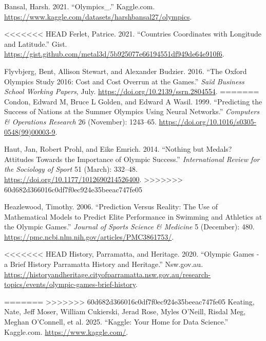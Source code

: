 \documentclass[
]{article}
\newlength{\cslhangindent}
\newenvironment{CSLReferences}[2] %
 {\begin{list}{}{%
  \setlength{\itemindent}{0pt}
  \setlength{\leftmargin}{0pt}
  \setlength{\parsep}{0pt}
  \ifodd #1
   \setlength{\leftmargin}{\cslhangindent}
   \setlength{\itemindent}{-1\cslhangindent}
  \fi
  \setlength{\itemsep}{#2\baselineskip}}}
 {\end{list}}
\begin{document}
\label{refs}
\begin{CSLReferences}{1}{0}
Bansal, Harsh. 2021. {``Olympics\_.''} Kaggle.com. \url{https://www.kaggle.com/datasets/harshbansal27/olympics}.

<<<<<<< HEAD
Ferlet, Patrice. 2021. {``Countries Coordinates with Longitude and Latitude.''} Gist. \url{https://gist.github.com/metal3d/5b925077e66194551df949de64e910f6}.

Flyvbjerg, Bent, Allison Stewart, and Alexander Budzier. 2016. {``The Oxford Olympics Study 2016: Cost and Cost Overrun at the Games.''} \emph{Saïd Business School Working Papers}, July. \url{https://doi.org/10.2139/ssrn.2804554}.
=======
Condon, Edward M, Bruce L Golden, and Edward A Wasil. 1999. {``Predicting the Success of Nations at the Summer Olympics Using Neural Networks.''} \emph{Computers \& Operations Research} 26 (November): 1243--65. \url{https://doi.org/10.1016/s0305-0548(99)00003-9}.

Haut, Jan, Robert Prohl, and Eike Emrich. 2014. {``Nothing but Medals? Attitudes Towards the Importance of Olympic Success.''} \emph{International Review for the Sociology of Sport} 51 (March): 332--48. \url{https://doi.org/10.1177/1012690214526400}.
>>>>>>> 60d682d366016c0df7f0ec924e35beeac747fe05

Heazlewood, Timothy. 2006. {``Prediction Versus Reality: The Use of Mathematical Models to Predict Elite Performance in Swimming and Athletics at the Olympic Games.''} \emph{Journal of Sports Science \& Medicine} 5 (December): 480. \url{https://pmc.ncbi.nlm.nih.gov/articles/PMC3861753/}.

<<<<<<< HEAD
History, Parramatta, and Heritage. 2020. {``Olympic Games - a Brief History \textbar{} Parramatta History and Heritage.''} Nsw.gov.au. \url{https://historyandheritage.cityofparramatta.nsw.gov.au/research-topics/events/olympic-games-brief-history}.

=======
>>>>>>> 60d682d366016c0df7f0ec924e35beeac747fe05
Keating, Nate, Jeff Moser, William Cukierski, Jerad Rose, Myles O'Neill, Risdal Meg, Meghan O'Connell, et al. 2025. {``Kaggle: Your Home for Data Science.''} Kaggle.com. \url{https://www.kaggle.com/}.

\end{CSLReferences}
\end{document}
